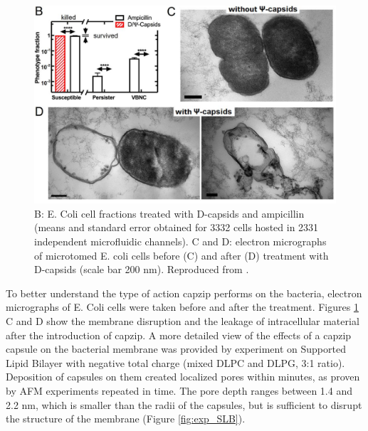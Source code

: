 \begin{figure}
\begin{center}
\includegraphics[width=0.8\linewidth, align = c]{1introduction/pics/ecoli_disruption}
\caption[Effect of capzip on bacterial cells]{B: E. Coli cell fractions treated with D-capsids and ampicillin (means and standard error obtained for 3332 cells hosted in 2331 independent microfluidic channels). C and D: electron micrographs of microtomed E. coli cells before (C) and after (D) treatment with D-capsids (scale bar 200 nm). Reproduced from \citet{Kepiro2019}.} \label{fig:exp_ecoli}
\end{center}
\end{figure}

To better understand the type of action capzip performs on the bacteria, electron micrographs of E. Coli cells were taken before and after the treatment. Figures \ref{fig:exp_ecoli} C and D show the membrane disruption and the leakage of intracellular material after the introduction of capzip.
%
A more detailed view of the effects of a capzip capsule on the bacterial membrane was provided by experiment on Supported Lipid Bilayer with negative total charge (mixed DLPC and DLPG, 3:1 ratio). Deposition of capsules on them created localized pores within minutes, as proven by AFM experiments repeated in time. The pore depth ranges between 1.4 and 2.2 nm, which is smaller than the radii of the capsules, but is sufficient to disrupt the structure of the membrane (Figure \ref{fig:exp_SLB}).

